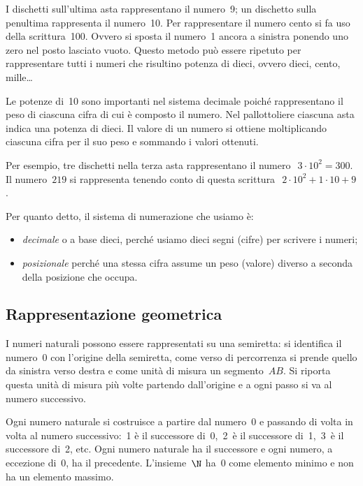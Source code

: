 I dischetti sull'ultima asta rappresentano il numero~9; un dischetto sulla 
penultima rappresenta il numero~10. 
Per rappresentare il numero cento si fa uso della scrittura~100.
Ovvero si sposta il numero~1 ancora a sinistra ponendo uno zero nel posto 
lasciato vuoto.
Questo metodo può essere ripetuto per rappresentare tutti i numeri che 
risultino potenza di dieci, ovvero dieci, cento, mille\ldots

Le potenze di~10 sono importanti nel sistema decimale poiché rappresentano 
il peso di ciascuna cifra di cui è composto il numero. 
Nel pallottoliere ciascuna asta indica una potenza di dieci. 
Il valore di un numero si ottiene moltiplicando ciascuna cifra per il
suo peso e sommando i valori ottenuti.

Per esempio, tre dischetti nella terza asta rappresentano il 
numero~\(~3\cdot 10^2=300\).
Il numero~\(219\) si rappresenta tenendo conto di questa 
scrittura~\(~2\cdot 10^2+1\cdot 10+9\).

Per quanto detto, il sistema di numerazione che usiamo è:

\begin{itemize} [noitemsep]
 \item \emph{decimale} o a base dieci, 
  perché usiamo dieci segni (cifre) per scrivere i numeri;
 \item \emph{posizionale} 
  perché una stessa cifra assume un peso (valore) diverso a seconda della 
  posizione che occupa.
\end{itemize}

\subsection{Rappresentazione geometrica}
I numeri naturali possono essere rappresentati su una semiretta: 
si identifica il numero~0 con l'origine della semiretta, come verso di 
percorrenza si prende quello da sinistra verso destra e come unità di 
misura un segmento~\(AB\). 
Si riporta questa unità di misura più volte partendo dall'origine e a ogni 
passo si va al numero successivo.

\begin{inaccessibleblock}
\begin{center}
 
\end{center}
\end{inaccessibleblock}

Ogni numero naturale si costruisce a partire dal numero~0 e passando di 
volta in volta al numero successivo:~1 è il successore di~0,~2~è il 
successore di~1,~3~è il successore di~2, etc. 
Ogni numero naturale ha il successore e ogni numero, a eccezione di~0, ha il
precedente. 
L'insieme~\(\N\) ha~0 come elemento minimo e non ha un elemento massimo.

